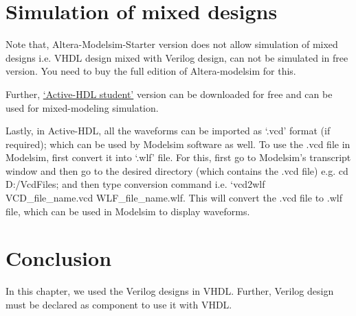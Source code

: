 \section{Simulation of mixed designs}
Note that, Altera-Modelsim-Starter version does not allow simulation of mixed designs i.e. VHDL design mixed with Verilog design, can not be simulated in free version. You need to buy the full edition of Altera-modelsim for this. 

Further, \href{https://www.aldec.com/en/products/fpga_simulation/active_hdl_student}{`Active-HDL student'} version can be downloaded for free and can be used for mixed-modeling simulation. 

Lastly, in Active-HDL, all the waveforms can be imported as `.vcd' format (if required); which can be used by Modelsim software as well. To use the .vcd file in Modelsim, first convert it into `.wlf' file. For this, first go to Modelsim's transcript window and then go to the desired directory (which contains the .vcd file) e.g. cd D:/VcdFiles; and then type conversion command i.e. `vcd2wlf VCD\_file\_name.vcd WLF\_file\_name.wlf. This will convert the .vcd file to .wlf file, which can be used in Modelsim to display waveforms. 


\section{Conclusion}
In this chapter, we used the Verilog designs in VHDL. Further, Verilog design must be declared as component to use it with VHDL. 
